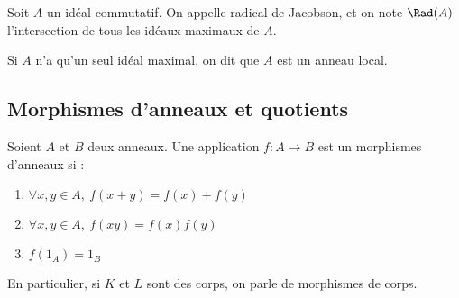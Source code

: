 \begin{defi}
 

 Soit $A$ un idéal commutatif. On appelle radical de Jacobson, et on note $\Rad
(A)$ l'intersection de tous les idéaux maximaux de $A$.

Si $A$ n'a qu'un seul idéal maximal, on dit que $A$ est un anneau local.
\end{defi}

\subsection{Morphismes d'anneaux et quotients}
\vspace{0.5em}


\begin{defi}
 

 Soient $A$ et $B$ deux anneaux. Une application $f : A \rightarrow B$ est un
morphismes d'anneaux si :
\begin{enumerate}
 \item $\forall x,y \in A,\ f(x+y) = f(x) + f(y)$
 \item $\forall x,y \in A,\ f(xy) = f(x) f(y)$
 \item $f(1_A) = 1_B$
\end{enumerate}

En particulier, si $K$ et $L$ sont des corps, on parle de morphismes de corps.
\end{defi}

